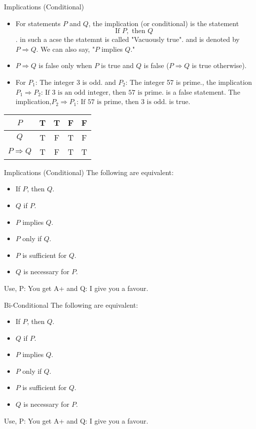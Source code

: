 \documentclass{beamer}
\begin{document}
\begin{frame}{Implications (Conditional)}
    \begin{itemize}
    \item For statements $P$ and $Q$, the implication (or conditional) is the statement
    $$\text{If } P, \text{ then } Q$$. in such a acse the statemnt is called "Vacuously true".
    and is denoted by $P \Rightarrow Q$. We can also say, "$P$ implies $Q$."
    \item $P \Rightarrow Q$ is false only when $P$ is true and $Q$ is false ($P \Rightarrow Q$ is true otherwise).
    \item For $P_1$: The integer 3 is odd. and $P_2$: The integer 57 is prime., the implication
    $P_1 \Rightarrow P_2 \text{: If 3 is an odd integer, then 57 is prime.}$
    is a false statement. The implication,$P_2 \Rightarrow P_1 \text{: If 57 is prime, then 3 is odd.}$
is true.
    \end{itemize}
    \begin{center}
\begin{tabular}{|c|c|c|c|c|}
    \hline
    $P$ & T & T & F & F \\
    \hline
    $Q$ & T & F & T & F \\
    \hline
    $P \Rightarrow Q$ & T & F & T & T \\
    \hline
\end{tabular}
\end{center}
\end{frame}

\begin{frame}{Implications (Conditional)}
    The following are equivalent: 
    \begin{itemize}
    
    \item If $P$, then $Q$.
    \item $Q$ if $P$.
    \item $P$ implies $Q$.
    \item $P$ only if $Q$.
    \item $P$ is sufficient for $Q$.
    \item $Q$ is necessary for $P$.
    \end{itemize}

Use, P: You get A+ and Q: I give you a favour.
\end{frame}

\begin{frame}{Bi-Conditional}
    The following are equivalent: 
    \begin{itemize}
    
    \item If $P$, then $Q$.
    \item $Q$ if $P$.
    \item $P$ implies $Q$.
    \item $P$ only if $Q$.
    \item $P$ is sufficient for $Q$.
    \item $Q$ is necessary for $P$.
    \end{itemize}

Use, P: You get A+ and Q: I give you a favour.
\end{frame}
\end{document}
